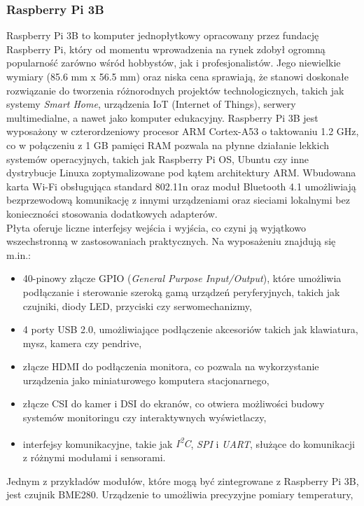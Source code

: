 \documentclass[12pt]{article}
\begin{document}
\subsubsection{Raspberry Pi 3B}
Raspberry Pi 3B to komputer jednopłytkowy opracowany przez fundację Raspberry Pi, który od momentu wprowadzenia na rynek zdobył ogromną popularność zarówno wśród hobbystów,
jak i profesjonalistów. Jego niewielkie wymiary (85.6 mm x 56.5 mm) oraz niska cena sprawiają,
że stanowi doskonałe rozwiązanie do tworzenia różnorodnych projektów technologicznych, takich jak systemy \textit{Smart Home},
urządzenia IoT (Internet of Things), serwery multimedialne, a nawet jako komputer edukacyjny.
Raspberry Pi 3B jest wyposażony w czterordzeniowy procesor ARM Cortex-A53 o taktowaniu 1.2 GHz, co w połączeniu z 1 GB pamięci RAM
pozwala na płynne działanie lekkich systemów operacyjnych, takich jak Raspberry Pi OS, Ubuntu czy inne dystrybucje Linuxa zoptymalizowane pod kątem architektury ARM.
Wbudowana karta Wi-Fi obsługująca standard 802.11n oraz moduł Bluetooth 4.1 umożliwiają bezprzewodową komunikację z innymi urządzeniami
oraz sieciami lokalnymi bez konieczności stosowania dodatkowych adapterów.\\
Płyta oferuje liczne interfejsy wejścia i wyjścia, co czyni ją wyjątkowo wszechstronną w zastosowaniach praktycznych. Na wyposażeniu znajdują się m.in.:
\begin{itemize}
    \item 40-pinowy złącze GPIO (\textit{General Purpose Input/Output}), które umożliwia podłączanie i sterowanie szeroką gamą urządzeń peryferyjnych,
          takich jak czujniki, diody LED, przyciski czy serwomechanizmy,
    \item 4 porty USB 2.0, umożliwiające podłączenie akcesoriów takich jak klawiatura, mysz, kamera czy pendrive,
    \item złącze HDMI do podłączenia monitora, co pozwala na wykorzystanie urządzenia jako miniaturowego komputera stacjonarnego,
    \item złącze CSI do kamer i DSI do ekranów, co otwiera możliwości budowy systemów monitoringu czy interaktywnych wyświetlaczy,
    \item interfejsy komunikacyjne, takie jak \textit{I\textsuperscript{2}C}, \textit{SPI} i \textit{UART}, służące do komunikacji z różnymi modułami i sensorami.
\end{itemize}
Jednym z przykładów modułów, które mogą być zintegrowane z Raspberry Pi 3B, jest czujnik BME280. Urządzenie to umożliwia precyzyjne pomiary temperatury,
\end{document}
